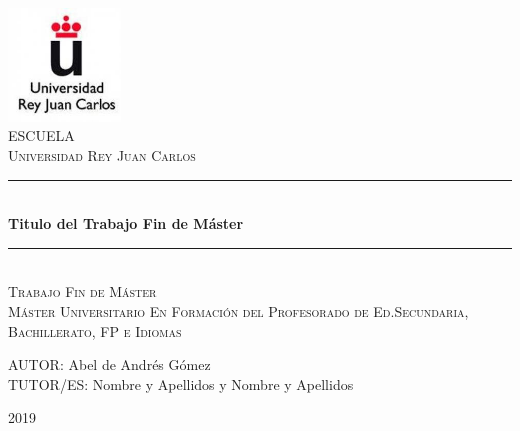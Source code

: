 \documentclass[spanish,12pt, a4paper,twoside]{paper}
\begin{document}
\begin{titlepage}

\newcommand{\HRule}{\rule{\linewidth}{0.5mm}} %

\renewcommand{\baselinestretch}{1.5}

\center %
 
  \hspace{9cm}
\includegraphics[width=3cm]{recursos/logo_urjc.jpg}
\\[1cm]

\textsc{\Large ESCUELA}\\[0.5cm]
\textsc{\large Universidad Rey Juan Carlos }
\\[3cm]


 \HRule \\[0.4cm]
{ \huge \bfseries Titulo del Trabajo Fin de Máster}\\[0.4cm] %
\HRule \\[2.5cm]

\textsc{\LARGE Trabajo Fin de Máster}\\[0.5cm] 
\textsc{\Large Máster Universitario En Formación del Profesorado de Ed.Secundaria, Bachillerato, FP e Idiomas }\\[2.5cm]

\begin{flushright}
\large
AUTOR: Abel de Andrés Gómez\\
TUTOR/ES: Nombre y Apellidos y \linebreak
                    Nombre y Apellidos
\end{flushright}

\vspace{1.3cm}

{ {2019}}\\[3cm]

\vfill %

\end{titlepage}
\end{document}
